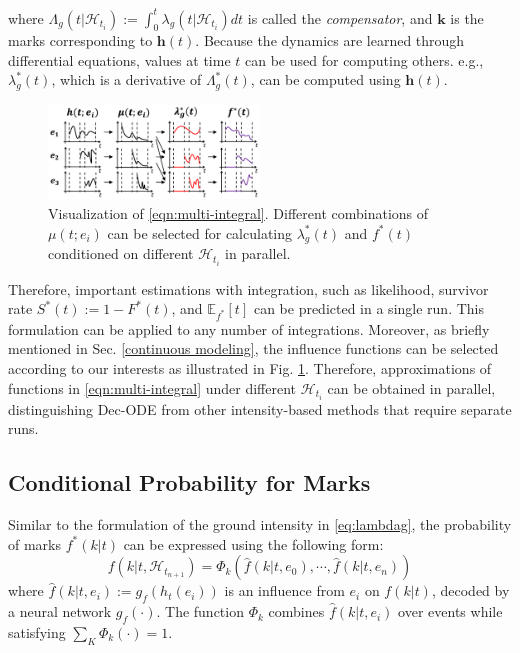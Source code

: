 where $\Lambda_g (t|\mathcal{H}_{t_i}) := \int ^t _0 \lambda_g (t | \mathcal{H}_{t_i}) dt$ is called the \textit{compensator}, and $\mathbf{k}$ is the marks corresponding to $\mathbf{h}(t)$. Because the dynamics are learned through differential equations, values at time $t$ can be used for computing others. e.g., $\lambda^*_g(t)$, which is a derivative of $\Lambda^*_g(t)$, can be computed using $\mathbf{h}(t)$.

\begin{figure}
\includegraphics[width=0.50\textwidth]{figure/eq_9_figure2.png}
\captionsetup[figure]{font=small}
\caption{\small Visualization of \eqref{eqn:multi-integral}. Different combinations of $\mu(t;e_i)$ can be selected for calculating $\lambda ^*_g(t)$ and $f^*(t)$ conditioned on different $\mathcal{H}_{t_i}$ in parallel.}
\label{fig: selective DE}
\end{figure} 
Therefore, important estimations with integration, such as likelihood, survivor rate $S ^* (t) := 1- F^*(t)$, 
and $\mathbb{E}_{f^*} [t]$ can be predicted in a single run. 
This formulation can be applied to any number of integrations.
Moreover, as briefly mentioned in Sec. \ref{continuous modeling}, the influence functions can be selected according to our interests as illustrated in Fig. \ref{fig: selective DE}. 
Therefore, approximations of functions in \eqref{eqn:multi-integral} under different $\mathcal{H}_{t_i}$ can be obtained in parallel, distinguishing Dec-ODE from other intensity-based methods that require separate runs. 

\subsection{Conditional Probability for Marks \label{sec:fk}}

Similar to the formulation of the ground intensity in \eqref{eq:lambdag}, the probability of marks $f^* (k|t)$ can be expressed using the following form: 
\begin{equation}
 f(k|t, \mathcal{H}_{t_{n+1}}) = \Phi _k( \hat{f}(k|t,e_0), \cdots, \hat{f}(k|t,e_{n}))
 \end{equation}
where $\hat{f}(k|t,e_i):= g_f(h_t(e_i))$ is an influence from $e_i$ on $f(k|t)$, decoded by a neural network $g_f(\cdot)$. The function $\Phi_k$ combines $\hat{f}(k|t,e_i)$ over events while satisfying $\sum _K \Phi_k(\cdot)  = 1$. 


